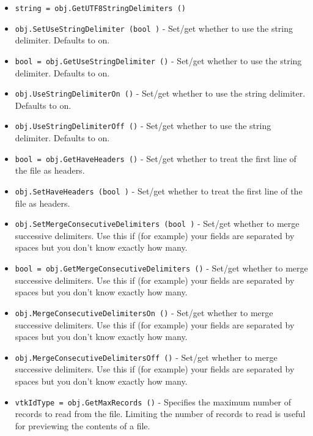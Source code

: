 \begin{itemize}
\item  \verb|string = obj.GetUTF8StringDelimiters ()|

\item  \verb|obj.SetUseStringDelimiter (bool )| -  Set/get whether to use the string delimiter.  Defaults to on.

\item  \verb|bool = obj.GetUseStringDelimiter ()| -  Set/get whether to use the string delimiter.  Defaults to on.

\item  \verb|obj.UseStringDelimiterOn ()| -  Set/get whether to use the string delimiter.  Defaults to on.

\item  \verb|obj.UseStringDelimiterOff ()| -  Set/get whether to use the string delimiter.  Defaults to on.

\item  \verb|bool = obj.GetHaveHeaders ()| -  Set/get whether to treat the first line of the file as headers.

\item  \verb|obj.SetHaveHeaders (bool )| -  Set/get whether to treat the first line of the file as headers.

\item  \verb|obj.SetMergeConsecutiveDelimiters (bool )| -  Set/get whether to merge successive delimiters.  Use this if (for
 example) your fields are separated by spaces but you don't know
 exactly how many.

\item  \verb|bool = obj.GetMergeConsecutiveDelimiters ()| -  Set/get whether to merge successive delimiters.  Use this if (for
 example) your fields are separated by spaces but you don't know
 exactly how many.

\item  \verb|obj.MergeConsecutiveDelimitersOn ()| -  Set/get whether to merge successive delimiters.  Use this if (for
 example) your fields are separated by spaces but you don't know
 exactly how many.

\item  \verb|obj.MergeConsecutiveDelimitersOff ()| -  Set/get whether to merge successive delimiters.  Use this if (for
 example) your fields are separated by spaces but you don't know
 exactly how many.

\item  \verb|vtkIdType = obj.GetMaxRecords ()| -  Specifies the maximum number of records to read from the file.  Limiting the
 number of records to read is useful for previewing the contents of a file.


\end{itemize}
